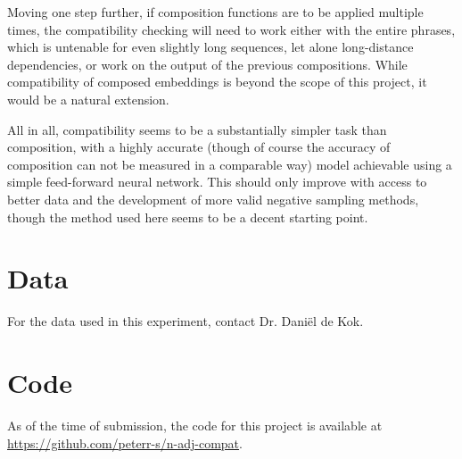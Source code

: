 \documentclass[a4paper, 12pt]{article}
\begin{document}
Moving one step further, if composition functions are to be applied multiple times, the compatibility checking will need to work either with the entire phrases, which is untenable for even slightly long sequences, let alone long-distance dependencies, or work on the output of the previous compositions. While compatibility of composed embeddings is beyond the scope of this project, it would be a natural extension.

All in all, compatibility seems to be a substantially simpler task than composition, with a highly accurate (though of course the accuracy of composition can not be measured in a comparable way) model achievable using a simple feed-forward neural network. This should only improve with access to better data and the development of more valid negative sampling methods, though the method used here seems to be a decent starting point.


\clearpage
\printbibliography                      %

\clearpage
\appendix
\appendixpage                           %
\addappheadtotoc                        %

\section{Data}
For the data used in this experiment, contact Dr. Dani\"el de Kok.

\section{Code}
As of the time of submission, the code for this project is available at \url{https://github.com/peterr-s/n-adj-compat}.
\end{document}
